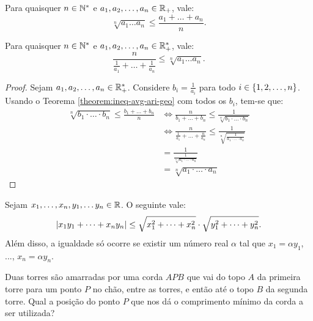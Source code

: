 \begin{theorem}
\label{theorem:ineq-avg-ari-geo}
Para quaisquer $n \in \mathbb{N}^*$ e $a_1, a_2, \dots , a_n \in \mathbb{R}_+$, vale:
%
\begin{equation*}
    \sqrt[n]{a_1\dots a_n} \leq \frac {a_1 + \dots + a_n} n.
\end{equation*}
\end{theorem}

\begin{theorem}
Para quaisquer $n \in \mathbb{N}^*$ e $a_1, a_2, \dots , a_n \in \mathbb{R}_+^*$, vale:
%
\begin{equation*}
    \frac n {\frac 1 {a_1} + \dots + \frac 1 {a_n}}  \leq \sqrt[n]{a_1\dots a_n}  .
\end{equation*}
\end{theorem}

\begin{proof}
Sejam $a_1, a_2, \dots, a_n \in \mathbb{R}_+ ^*$. Considere $b_i = \frac 1 {a_i}$ para todo $i \in \left\{1, 2, \dots, n\right\}$. Usando o Teorema \ref{theorem:ineq-avg-ari-geo} com todos os $b_i$, tem-se que:
%
\begin{align*}
\sqrt[n]{b_1 \cdot \dots \cdot b_n } \le \frac {b_1 + \dots + b_n } n & \iff \frac n {b_1 + \dots + b_n } \le \frac 1 {\sqrt[n]{b_1 \cdot \dots \cdot b_n }} \\
& \iff \frac n {\frac 1 {a_1} + \dots + \frac n {a_n}} \le \frac 1 {\sqrt[n]{\frac 1 {a_1 \cdot \dots \cdot a_n}}} \\ 
& = \frac 1 {\frac 1 {\sqrt[n]{a_1 \cdot \dots \cdot a_n}}}\\ 
& =  \sqrt[n]{a_1 \cdot \dots \cdot a_n}
\end{align*}
\end{proof}

\begin{theorem}
Sejam $x_1, \dots , x_n, y_1, \dots y_n \in \mathbb{R}$. O seguinte vale:
%
\begin{equation*}
    \left|x_1y_1 + \dots + x_ny_n\right| \leq \sqrt{x^2_1+ \dots + x^2_n}
    \cdot \sqrt{y^2_1+ \dots + y^2_n}.
\end{equation*}
%
Além disso, a igualdade só ocorre se existir um número real $\alpha$ tal que $x_1 = \alpha y_1$, ..., $x_n = \alpha y_n$.
\end{theorem}

\begin{example}
Duas torres são amarradas por uma corda $APB$ que vai do topo $A$ da primeira torre para um ponto $P$ no chão, entre as torres, e então
até o topo $B$ da segunda torre. Qual a posição do ponto $P$ que nos dá o comprimento mínimo da corda a ser utilizada?
\end{example}

